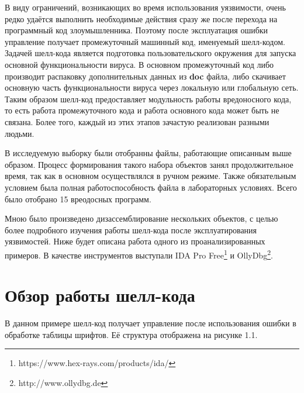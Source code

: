 В виду ограничений, возникающих во время использования уязвимости, очень редко удаётся выполнить необходимые действия сразу же после перехода на программный код злоумышленника.
Поэтому после эксплуатация ошибки управление получает промежуточный машинный код, именуемый шелл-кодом.
Задачей шелл-кода является подготовка пользовательского окружения для запуска основной функциональности вируса.
В основном промежуточный код либо производит распаковку дополнительных данных из \textbf{doc} файла, либо скачивает основную часть функциональности вируса через локальную или глобальную сеть.
Таким образом шелл-код предоставляет модульность работы вредоносного кода, то есть работа промежуточного кода и работа основного кода может быть не связана.
Более того, каждый из этих этапов зачастую реализован разными людьми.

В исследуемую выборку были отобранны файлы, работающие описанным выше образом.
Процесс формирования такого набора объектов занял продолжительное время, так как в основном осуществлялся в ручном режиме.
Также обязательным условием была полная работоспособность файла в лабораторных условиях.
Всего было отобрано 15 вреодосных программ.

Мною было произведено дизассемблирование нескольких объектов, с целью более подробного изучения работы шелл-кода после эксплуатирования уязвимостей.
Ниже будет описана работа одного из проанализированных примеров.
В качестве инструментов выступали IDA Pro Free\footnote{https://www.hex-rays.com/products/ida/} и OllyDbg\footnote{http://www.ollydbg.de}.

\newpage
\section{Обзор работы шелл-кода}

В данном примере шелл-код получает управление после использования ошибки в обработке таблицы шрифтов.
Её структура отображена на рисунке 1.1. 

